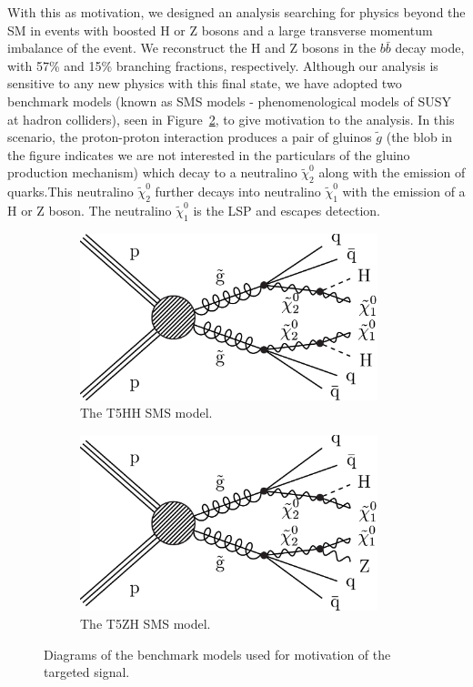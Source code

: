 With this as motivation, we designed an analysis searching for physics beyond the SM in events with boosted H or Z bosons and a large transverse momentum imbalance of the event. We reconstruct the H and Z bosons in the $b\bar{b}$ decay mode, with 57\% and 15\% branching fractions, respectively. Although our analysis is sensitive to any new physics with this final state, we have adopted two benchmark models (known as SMS models \cite{CMS-SUS-11-016} - phenomenological models of SUSY at hadron colliders), seen in Figure~\ref{fig:sms}, to give motivation to the analysis. In this scenario, the proton-proton interaction produces a pair of gluinos $\tilde{g}$ (the blob in the figure indicates we are not interested in the particulars of the gluino production mechanism) which decay to a neutralino $\tilde{\chi}_{2}^{0}$ along with the emission of quarks.This neutralino $\tilde{\chi}_{2}^{0}$ further decays into neutralino $\tilde{\chi}_{1}^{0}$ with the emission of a H or Z boson. The neutralino $\tilde{\chi}_{1}^{0}$ is the LSP and escapes detection.

\begin{figure}[hbp!]
\centering
\begin{subfigure}[b]{0.425\textwidth}
\includegraphics[width=0.95\textwidth]{figs/CMS-SUS-17-006_Figure_001.pdf}
\caption{The T5HH SMS model.}
\label{fig:t5hh}
\end{subfigure}
\begin{subfigure}[b]{0.425\textwidth}
\includegraphics[width=0.95\textwidth]{figs/CMS-SUS-17-006_Figure-aux_001.pdf}
\caption{The T5ZH SMS model.}
\end{subfigure}
\caption{Diagrams of the benchmark models used for motivation of the targeted signal.}
\label{fig:sms}
\end{figure}

